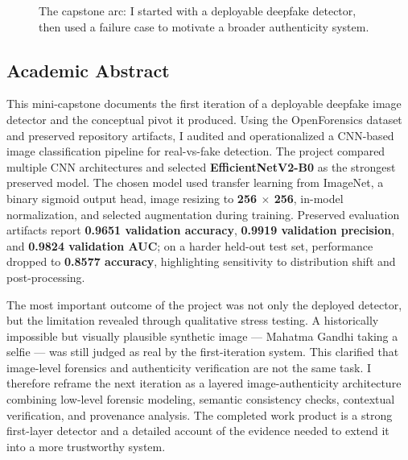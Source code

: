 \documentclass[11pt]{article}
\begin{document}
\begin{figure}[H]
\centering
{}
\caption{The capstone arc: I started with a deployable deepfake detector, then used a failure case to motivate a broader authenticity system.}
\label{fig:project-arc}
\end{figure}

\subsection{Academic Abstract}
This mini-capstone documents the first iteration of a deployable deepfake image detector and the conceptual pivot it produced. Using the OpenForensics dataset and preserved repository artifacts, I audited and operationalized a CNN-based image classification pipeline for real-vs-fake detection. The project compared multiple CNN architectures and selected \textbf{EfficientNetV2-B0} as the strongest preserved model. The chosen model used transfer learning from ImageNet, a binary sigmoid output head, image resizing to \textbf{256 $\times$ 256}, in-model normalization, and selected augmentation during training. Preserved evaluation artifacts report \textbf{0.9651 validation accuracy}, \textbf{0.9919 validation precision}, and \textbf{0.9824 validation AUC}; on a harder held-out test set, performance dropped to \textbf{0.8577 accuracy}, highlighting sensitivity to distribution shift and post-processing.

The most important outcome of the project was not only the deployed detector, but the limitation revealed through qualitative stress testing. A historically impossible but visually plausible synthetic image --- Mahatma Gandhi taking a selfie --- was still judged as real by the first-iteration system. This clarified that image-level forensics and authenticity verification are not the same task. I therefore reframe the next iteration as a layered image-authenticity architecture combining low-level forensic modeling, semantic consistency checks, contextual verification, and provenance analysis. The completed work product is a strong first-layer detector and a detailed account of the evidence needed to extend it into a more trustworthy system.
\end{document}
